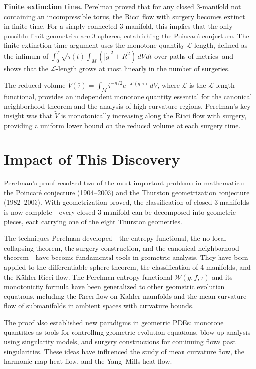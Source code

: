 \textbf{Finite extinction time.} Perelman proved that for any closed 3-manifold not containing an incompressible torus, the Ricci flow with surgery becomes extinct in finite time. For a simply connected 3-manifold, this implies that the only possible limit geometries are 3-spheres, establishing the Poincar\'e conjecture. The finite extinction time argument uses the monotone quantity $\mathcal{L}$-length, defined as the infimum of $\int_0^T \sqrt{\tau(t)} \int_M (|\dot{g}|^2 + R^2) \, dV \, dt$ over paths of metrics, and shows that the $\mathcal{L}$-length grows at most linearly in the number of surgeries.

The reduced volume $\tilde{V}(\bar{\tau}) = \int_M \bar{\tau}^{-n/2} e^{-\mathcal{L}(q,\bar{\tau})} \, dV$, where $\mathcal{L}$ is the $\mathcal{L}$-length functional, provides an independent monotone quantity essential for the canonical neighborhood theorem and the analysis of high-curvature regions. Perelman's key insight was that $\tilde{V}$ is monotonically increasing along the Ricci flow with surgery, providing a uniform lower bound on the reduced volume at each surgery time.

\section{Impact of This Discovery}

Perelman's proof resolved two of the most important problems in mathematics: the Poincar\'e conjecture (1904--2003) and the Thurston geometrization conjecture (1982--2003). With geometrization proved, the classification of closed 3-manifolds is now complete---every closed 3-manifold can be decomposed into geometric pieces, each carrying one of the eight Thurston geometries.

The techniques Perelman developed---the entropy functional, the no-local-collapsing theorem, the surgery construction, and the canonical neighborhood theorem---have become fundamental tools in geometric analysis. They have been applied to the differentiable sphere theorem, the classification of 4-manifolds, and the K\"ahler-Ricci flow. The Perelman entropy functional $\mathcal{W}(g,f,\tau)$ and its monotonicity formula have been generalized to other geometric evolution equations, including the Ricci flow on K\"ahler manifolds and the mean curvature flow of submanifolds in ambient spaces with curvature bounds.

The proof also established new paradigms in geometric PDEs: monotone quantities as tools for controlling geometric evolution equations, blow-up analysis using singularity models, and surgery constructions for continuing flows past singularities. These ideas have influenced the study of mean curvature flow, the harmonic map heat flow, and the Yang--Mills heat flow.

